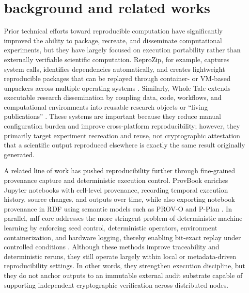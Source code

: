 \documentclass[conference]{IEEEtran}
\begin{document}
\section{\textbf{background and related works}}
Prior technical efforts toward reproducible computation have significantly improved the ability to package, recreate, and disseminate computational experiments, but they have largely focused on execution portability rather than externally verifiable scientific computation. ReproZip, for example, captures system calls, identifies dependencies automatically, and creates lightweight reproducible packages that can be replayed through container- or VM-based unpackers across multiple operating systems \cite{chirigati2016reprozip}. Similarly, Whole Tale extends executable research dissemination by coupling data, code, workflows, and computational environments into reusable research objects or ``living publications'' \cite{brinckman2019computing}. These systems are important because they reduce manual configuration burden and improve cross-platform reproducibility; however, they primarily target experiment recreation and reuse, not cryptographic attestation that a scientific output reproduced elsewhere is exactly the same result originally generated.

A related line of work has pushed reproducibility further through fine-grained provenance capture and deterministic execution control. ProvBook enriches Jupyter notebooks with cell-level provenance, recording temporal execution history, source changes, and outputs over time, while also exporting notebook provenance in RDF using semantic models such as PROV-O and P-Plan \cite{samuel2018provbook}. In parallel, mlf-core addresses the more stringent problem of deterministic machine learning by enforcing seed control, deterministic operators, environment containerization, and hardware logging, thereby enabling bit-exact replay under controlled conditions \cite{heumos2023mlf}. Although these methods improve traceability and deterministic reruns, they still operate largely within local or metadata-driven reproducibility settings. In other words, they strengthen execution discipline, but they do not anchor outputs to an immutable external audit substrate capable of supporting independent cryptographic verification across distributed nodes.
\end{document}
